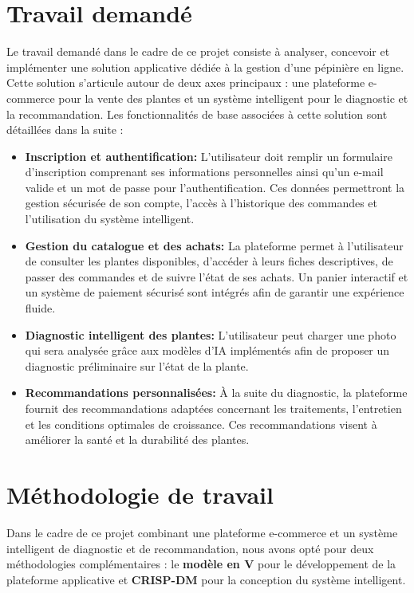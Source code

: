 \section{Travail demandé}
Le travail demandé dans le cadre de ce projet consiste à analyser, concevoir et 
implémenter une solution applicative dédiée à la gestion d'une pépinière 
en ligne. Cette solution s'articule autour de deux axes principaux : une plateforme 
e-commerce pour la vente des plantes et un système intelligent pour le diagnostic et la 
recommandation. Les fonctionnalités de base associées à cette solution sont détaillées dans la suite :
\begin{itemize}
 \renewcommand{\labelitemi}{•}
\item \textbf{Inscription et authentification:} L'utilisateur doit remplir un formulaire 
d'inscription comprenant ses informations personnelles ainsi qu'un e-mail valide et un mot 
de passe pour l'authentification.
\newline Ces données permettront la gestion sécurisée de son compte, l'accès à l'historique 
des commandes et l'utilisation du système intelligent.
\item \textbf{Gestion du catalogue et des achats:} La plateforme permet à l'utilisateur de 
consulter les plantes disponibles, d'accéder à leurs fiches descriptives, de passer des 
commandes et de suivre l'état de ses achats. Un panier interactif et un système de paiement 
sécurisé sont intégrés afin de garantir une expérience fluide.
\item \textbf{Diagnostic intelligent des plantes:} L'utilisateur peut charger une photo qui 
sera analysée grâce aux modèles d'IA implémentés afin de proposer un diagnostic préliminaire 
sur l'état de la plante.
\item \textbf{Recommandations personnalisées:} À la suite du diagnostic, la plateforme fournit 
des recommandations adaptées concernant les traitements, l'entretien et les conditions optimales 
de croissance. Ces recommandations visent à améliorer la santé et la durabilité des plantes.
\end{itemize}
\section{Méthodologie de travail}
Dans le cadre de ce projet combinant une plateforme e-commerce et un système intelligent de 
diagnostic et de recommandation, nous avons opté pour deux méthodologies complémentaires : le 
\textbf{modèle en V} pour le développement de la plateforme applicative et \textbf{CRISP-DM} pour 
la conception du système intelligent.

